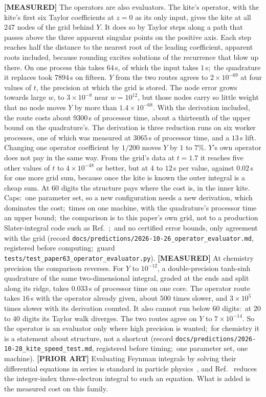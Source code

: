 \documentclass[aps,pra,twocolumn,superscriptaddress,longbibliography]{revtex4-2}
\begin{document}
\textbf{[MEASURED]} The operators are also evaluators.  The kite's operator,
with the kite's first six Taylor coefficients at $z=0$ as its only input,
gives the kite at all $247$ nodes of the grid behind $Y$.  It does so by Taylor
steps along a path that passes above the three apparent singular points on
the positive axis.  Each step reaches half the distance to the nearest root
of the leading coefficient, apparent roots included, because rounding
excites solutions of the recurrence that blow up there.  On one process this
takes $64$\,s, of which the input takes $1$\,s;\ the quadrature it replaces
took $7894$\,s on fifteen.  $Y$ from the two routes agrees to
$2\times10^{-69}$ at four values of $t$, the precision at which the grid is
stored.  The node error grows towards large $w$, to $3\times10^{-8}$ near
$w=10^{12}$, but those nodes carry so little weight that no node moves $Y$ by
more than $1.4\times10^{-68}$.  With the derivation included, the route
costs about $9300$\,s of processor time, about a thirteenth of the upper
bound on the quadrature's.  The derivation is three reduction runs on six
worker processes, one of which was measured at $3065$\,s of processor time,
and a $13$\,s lift.  Changing
one operator coefficient by $1/200$ moves $Y$ by $1$ to $7\%$.  $Y$'s own
operator does not pay in the same way.  From the grid's data at $t=1.7$ it
reaches five other values of $t$ to $4\times10^{-48}$ or better, but at $4$ to
$12$\,s per value, against $0.02$\,s for one more grid sum, because once the
kite is known the outer integral is a cheap sum.  At $60$ digits the structure pays where
the cost is, in the inner kite.  Caps:\ one parameter set, so a new
configuration needs a new derivation, which dominates the cost;\ times on one
machine, with the quadrature's processor time an upper bound;\ the
comparison is to this paper's own grid, not to a production Slater-integral
code such as Ref.~\cite{chen2026fourier};\ and no
certified error bounds, only agreement with the grid (record
\texttt{docs/predictions/2026-10-26\_operator\_evaluator.md}, registered before
computing;\ guard \texttt{tests/test\_paper63\_operator\_evaluator.py}).
\textbf{[MEASURED]} At chemistry precision the comparison reverses.  For $Y$ to $10^{-12}$, a
double-precision tanh-sinh quadrature of the same two-dimensional integral, graded at the
ends and split along its ridge, takes $0.033$\,s of processor time on one core.  The
operator route takes $16$\,s with the operator already given, about $500$ times slower,
and $3\times10^{5}$ times slower with its derivation counted.  It also cannot run below
$60$ digits:\ at $20$ to $40$ digits its Taylor walk diverges.  The two routes agree on $Y$
to $7\times10^{-14}$.  So the operator is an evaluator only where high precision is wanted;\
for chemistry it is a statement about structure, not a shortcut (record
\texttt{docs/predictions/2026-10-28\_kite\_speed\_test.md}, registered before timing;\ one
parameter set, one machine).  \textbf{[PRIOR ART]} Evaluating Feynman integrals by solving
their differential equations in series is standard in particle
physics~\cite{moriello2020,hidding2021,liu_ma2023}, and
Ref.~\cite{pkp2009} reduces the integer-index three-electron integral to such
an equation.  What is added is the measured cost on this family.
\end{document}

